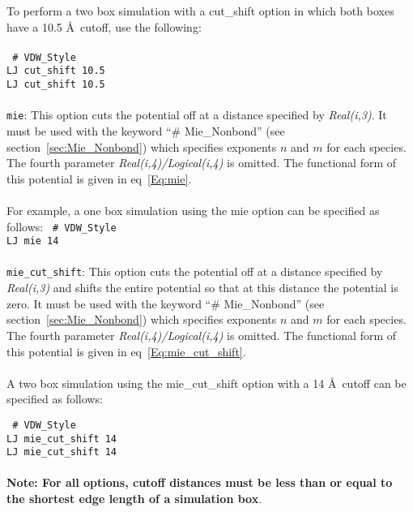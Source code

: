 %
To perform a two box simulation with a cut\_shift option in which both
boxes have a 10.5 \AA\ cutoff, use the following:
\\ \\
\texttt{
\# VDW\_Style \\
LJ cut\_shift 10.5 \\
LJ cut\_shift 10.5 } \\ \\
%
\texttt{mie}: This option cuts the potential off at a distance
specified by \emph{Real(i,3)}. It must be used with the keyword ``\# Mie\_Nonbond'' (see section~\ref{sec:Mie_Nonbond}) which specifies exponents $n$ and $m$ for each species. The fourth parameter
\emph{Real(i,4)/Logical(i,4)} is omitted. The functional form of this
potential is given in eq~\ref{Eq:mie}. \\ \\
%
For example, a one box simulation using the mie option can be specified as follows:
%
\texttt{
\# VDW\_Style \\
LJ mie 14 } \\ \\
%
\texttt{mie\_cut\_shift}: This option cuts the potential off at a distance
specified by \emph{Real(i,3)} and shifts the entire potential so that
at this distance the potential is zero. It must be used with the keyword ``\# Mie\_Nonbond'' (see section~\ref{sec:Mie_Nonbond}) which specifies exponents $n$ and $m$ for each species. The fourth parameter
\emph{Real(i,4)/Logical(i,4)} is omitted. The functional form of this
potential is given in eq~\ref{Eq:mie_cut_shift}. \\ \\
%
A two box simulation using the mie\_cut\_shift option with a 14 \AA\ cutoff can be specified as follows:

\texttt{
\# VDW\_Style \\
LJ mie\_cut\_shift 14 \\
LJ mie\_cut\_shift 14 } \\ \\
%
{\bf Note: For all options, cutoff distances must be less than or
  equal to the shortest edge length of a simulation box}.
%
%
